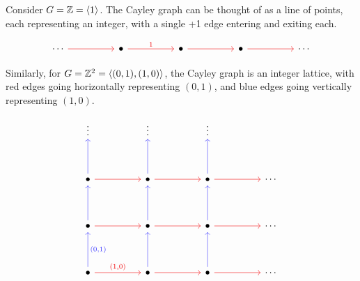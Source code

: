 \begin{example}
    Consider $G = \mathbb{Z} = \langle 1 \rangle$. The Cayley graph can be thought of as a line of points, each representing an integer, with a single +1 edge entering and exiting each.

    \[\begin{tikzcd}
        \cdots && \bullet && \bullet && \bullet && \cdots
        \arrow[color={rgb,255:red,240;green,0;blue,4}, from=1-1, to=1-3]
        \arrow["1", color={rgb,255:red,240;green,0;blue,4}, from=1-3, to=1-5]
        \arrow[color={rgb,255:red,240;green,0;blue,4}, from=1-5, to=1-7]
        \arrow[color={rgb,255:red,240;green,0;blue,4}, from=1-7, to=1-9]
    \end{tikzcd}\]

    Similarly, for $G = \mathbb{Z}^2 = \langle (0,1), (1,0) \rangle$, the Cayley graph is an integer lattice, with red edges going horizontally representing $(0,1)$, and blue edges going vertically representing $(1,0)$. 

    \[\begin{tikzcd}
        \vdots && \vdots && \vdots \\
        \\
        \bullet && \bullet && \bullet && \cdots \\
        \\
        \bullet && \bullet && \bullet && \cdots \\
        \\
        \bullet && \bullet && \bullet && \cdots
        \arrow[color={rgb,255:red,54;green,51;blue,255}, from=3-1, to=1-1]
        \arrow[color={rgb,255:red,240;green,0;blue,4}, from=3-1, to=3-3]
        \arrow[color={rgb,255:red,54;green,51;blue,255}, from=3-3, to=1-3]
        \arrow[color={rgb,255:red,240;green,0;blue,4}, from=3-3, to=3-5]
        \arrow[color={rgb,255:red,54;green,51;blue,255}, from=3-5, to=1-5]
        \arrow[color={rgb,255:red,240;green,0;blue,4}, from=3-5, to=3-7]
        \arrow[color={rgb,255:red,54;green,51;blue,255}, from=5-1, to=3-1]
        \arrow[color={rgb,255:red,240;green,0;blue,4}, from=5-1, to=5-3]
        \arrow[color={rgb,255:red,54;green,51;blue,255}, from=5-3, to=3-3]
        \arrow[color={rgb,255:red,240;green,0;blue,4}, from=5-3, to=5-5]
        \arrow[color={rgb,255:red,54;green,51;blue,255}, from=5-5, to=3-5]
        \arrow[color={rgb,255:red,240;green,0;blue,4}, from=5-5, to=5-7]
        \arrow["{(0,1)}"', color={rgb,255:red,54;green,51;blue,255}, from=7-1, to=5-1]
        \arrow["{(1,0)}", color={rgb,255:red,240;green,0;blue,4}, from=7-1, to=7-3]
        \arrow[color={rgb,255:red,54;green,51;blue,255}, from=7-3, to=5-3]
        \arrow[color={rgb,255:red,240;green,0;blue,4}, from=7-3, to=7-5]
        \arrow[color={rgb,255:red,54;green,51;blue,255}, from=7-5, to=5-5]
        \arrow[color={rgb,255:red,240;green,0;blue,4}, from=7-5, to=7-7]
    \end{tikzcd}\]
\end{example}

